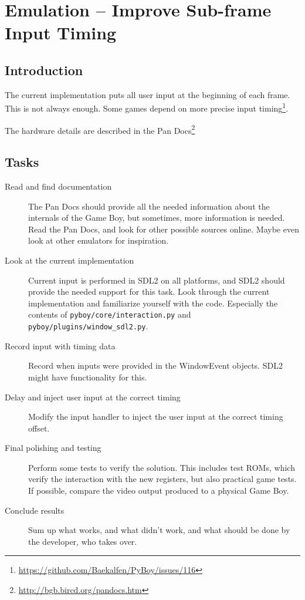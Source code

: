 \documentclass[11pt]{report} %
\begin{document}
\chapter*{Emulation -- Improve Sub-frame Input Timing}
\section*{Introduction}
The current implementation puts all user input at the beginning of each frame. This is not always enough. Some games depend on more precise input timing\footnote{\url{https://github.com/Baekalfen/PyBoy/issues/116}}.

The hardware details are described in the Pan Docs\footnote{\url{http://bgb.bircd.org/pandocs.htm}}

\section*{Tasks}
\begin{description}
    \item [Read and find documentation]
        The Pan Docs should provide all the needed information about the internals of the Game Boy, but sometimes, more information is needed. Read the Pan Docs, and look for other possible sources online. Maybe even look at other emulators for inspiration.

    \item [Look at the current implementation]
        Current input is performed in SDL2 on all platforms, and SDL2 should provide the needed support for this task. Look through the current implementation and familiarize yourself with the code. Especially the contents of \texttt{pyboy/core/interaction.py} and \texttt{pyboy/plugins/window_sdl2.py}.

    \item [Record input with timing data]
        Record when inputs were provided in the WindowEvent objects. SDL2 might have functionality for this.

    \item [Delay and inject user input at the correct timing]
        Modify the input handler to inject the user input at the correct timing offset.

    \item [Final polishing and testing]
        Perform some tests to verify the solution. This includes test ROMs, which verify the interaction with the new registers, but also practical game tests. If possible, compare the video output produced to a physical Game Boy.

    \item [Conclude results]
        Sum up what works, and what didn't work, and what should be done by the developer, who takes over.

\end{description}
\end{document}
